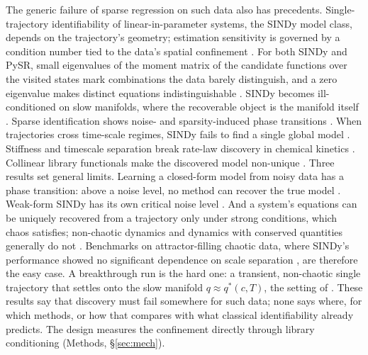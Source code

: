 \documentclass[11pt]{article}
\newcommand{\qs}{q^{*}}
\begin{document}
The generic failure of sparse regression on such data also has precedents.
Single-trajectory identifiability of linear-in-parameter systems, the SINDy model class,
depends on the trajectory's geometry; estimation sensitivity is governed by a condition
number tied to the data's spatial confinement \citep{stanhope2014}. For both SINDy and
PySR, small eigenvalues of the moment matrix of the candidate functions over the visited
states mark combinations the data barely distinguish, and a zero eigenvalue makes distinct
equations indistinguishable \citep{gallo2026}. SINDy becomes ill-conditioned on slow
manifolds, where the recoverable object is the manifold itself \citep{delgado2025}. Sparse
identification shows noise- and sparsity-induced phase transitions \citep{klishin2024}.
When trajectories cross time-scale regimes, SINDy fails to find a single global model
\citep{muhammed2025}. Stiffness and timescale separation break rate-law discovery in
chemical kinetics \citep{prabhu2025,huang2021}. Collinear library functionals make the
discovered model non-unique \citep{delahunt2021}. Three results set general limits. Learning
a closed-form model from noisy data has a phase transition: above a noise level, no method
can recover the true model \citep{fajardo2023}. Weak-form SINDy has its own critical noise
level \citep{messenger2024}. And a system's equations can be uniquely recovered from a
trajectory only under strong conditions, which chaos satisfies; non-chaotic dynamics and
dynamics with conserved quantities generally do not \citep{shumaylov2025}. Benchmarks on
attractor-filling chaotic data, where SINDy's performance showed no significant dependence on
scale separation \citep{kaptanoglu2023}, are therefore the easy case. A breakthrough run is
the hard one: a transient, non-chaotic single trajectory that settles onto the slow manifold
$q \approx \qs(c,T)$, the setting of \citep{stanhope2014,gallo2026,delgado2025}. These
results say that discovery must fail somewhere for such data; none says where, for which
methods, or how that compares with what classical identifiability already predicts. The
design measures the confinement directly through library conditioning (Methods,
\S\ref{sec:mech}).
\end{document}
